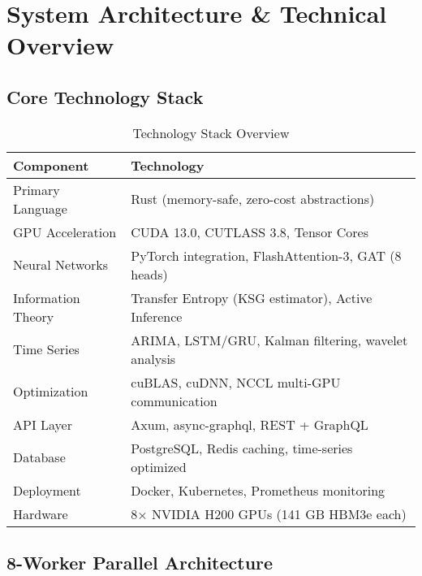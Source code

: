 \documentclass[11pt,letterpaper]{article}
\begin{document}
\newpage

\section{System Architecture \& Technical Overview}

\subsection{Core Technology Stack}

\begin{table}[H]
\centering
\begin{tabularx}{\textwidth}{lX}
\toprule
\textbf{Component} & \textbf{Technology} \\
\midrule
Primary Language & Rust (memory-safe, zero-cost abstractions) \\
GPU Acceleration & CUDA 13.0, CUTLASS 3.8, Tensor Cores \\
Neural Networks & PyTorch integration, FlashAttention-3, GAT (8 heads) \\
Information Theory & Transfer Entropy (KSG estimator), Active Inference \\
Time Series & ARIMA, LSTM/GRU, Kalman filtering, wavelet analysis \\
Optimization & cuBLAS, cuDNN, NCCL multi-GPU communication \\
API Layer & Axum, async-graphql, REST + GraphQL \\
Database & PostgreSQL, Redis caching, time-series optimized \\
Deployment & Docker, Kubernetes, Prometheus monitoring \\
Hardware & 8× NVIDIA H200 GPUs (141 GB HBM3e each) \\
\bottomrule
\end{tabularx}
\caption{Technology Stack Overview}
\end{table}

\subsection{8-Worker Parallel Architecture}
\end{document}
